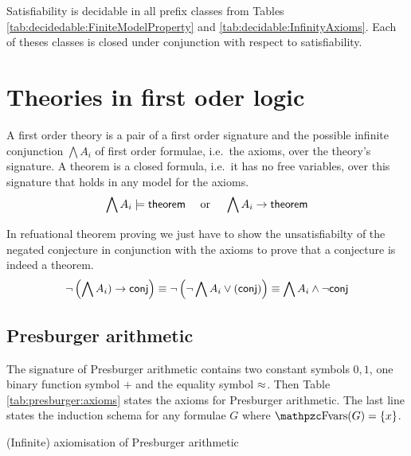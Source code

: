 \begin{lemma}
	Satisfiability is decidable \cite{MR1482227} in all prefix classes from Tables 
	\ref{tab:decidedable:FiniteModelProperty} and \ref{tab:decidable:InfinityAxioms}.
	Each of theses classes is closed under conjunction with respect to satisfiability.
\end{lemma}



\section{Theories in first oder logic}\label{sec:decidable:fol:theories}

\begin{definition}
	A {\myem first order theory} is a pair of a first order signature and the possible infinite conjunction $\bigwedge A_i$ of first order formulae, i.e.~the axioms, over the theory's signature. A {\myem theorem} is a closed formula, i.e.~it has no free variables, over this signature that holds in any model for the axioms.
	\[
		\bigwedge A_i \models \mathsf{theorem} 
		\quad\text{ or }\quad
		\bigwedge A_i \rightarrow \mathsf{theorem} 
	\]
\end{definition}
%
\noindent 
In refuational theorem proving
we just have to show the unsatisfiabilty 
of the negated conjecture in conjunction with the axioms
to prove that a conjecture is indeed a theorem.
\[
	\lnot\left(\bigwedge A_i) \rightarrow \mathsf{conj}\right) \equiv
	\lnot\left(\lnot\bigwedge A_i \lor \mathsf{(conj)}\right) \equiv
	\bigwedge A_i \land \lnot \mathsf{conj}
\]






\subsection{Presburger arithmetic}

The signature of Presburger arithmetic contains two constant symbols $0,1$, 
one binary function symbol $+$ and the equality symbol $\approx$.
Then Table \ref{tab:presburger:axioms} states the axioms for Presburger arithmetic. 
The last line states the induction schema for any formulae $G$ where $\fvar(G) = \{ x \}$.

\begin{table}[hbt]
	
	\caption{(Infinite) axiomisation of Presburger arithmetic}
	\label{tab:presburger:axioms}
\end{table}

